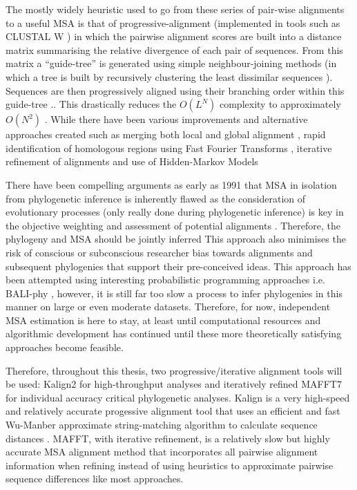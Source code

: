 The mostly widely heuristic used to go from these series of pair-wise alignments to
a useful MSA is that of progressive-alignment \citep{Feng1987} (implemented in 
tools such as CLUSTAL W \citep{Thompson1994}) in which the pairwise alignment
scores are built into a distance matrix summarising the relative divergence of 
each pair of sequences. From this matrix a ``guide-tree'' is generated using simple
neighbour-joining methods (in which a tree is built by recursively clustering
the least dissimilar sequences \citep{Saitou1987}).  Sequences are then progressively
aligned using their branching order within this guide-tree \citep{Thompson1994}..
This drastically reduces the \(O(L^{N})\) complexity to approximately \(O(N^{2})\)
\citep{Sievers2011}. While there have been various improvements and alternative approaches
created such as merging both local and global alignment \citep{Notredame2000}, 
rapid identification of homologous regions using Fast Fourier Transforms \citep{Katoh2002},
iterative refinement of alignments \citep{Edgar2004a} and use of Hidden-Markov Models \citep{Eddy1995}


There have been compelling arguments as early as 1991 that MSA in isolation from
phylogenetic inference is inherently flawed as the consideration of 
evolutionary processes (only really done during phylogenetic inference) 
is key in the objective weighting and assessment of potential alignments \citep{Thorne1991}.
Therefore, the phylogeny and MSA should be jointly inferred \citep{Thorne1991,Redelings2005,Bouchard-Cote2013}
This approach also minimises the risk of conscious or subconscious researcher bias 
towards alignments and subsequent phylogenies that support their pre-conceived ideas.
This approach has been attempted using interesting probabilistic programming approaches
i.e. BALI-phy \citep{Suchard2006}, however, it is still far too
slow a process to infer phylogenies in this manner on large or even moderate datasets.
Therefore, for now, independent MSA estimation is here to stay, at least until
computational resources and algorithmic development has continued until these more
theoretically satisfying approaches become feasible.  

Therefore, throughout this thesis, two progressive/iterative alignment tools will be used:
Kalign2 \citep{Lassmann2005,Lassmann2009} for high-throughput analyses and iteratively refined 
MAFFT7 \citep{Katoh2002,Katoh2005,Katoh2013} for individual accuracy critical phylogenetic analyses. 
Kalign is a very high-speed and relatively accurate \citep{Thompson2011} progessive alignment tool that uses
an efficient and fast Wu-Manber approximate string-matching algorithm to calculate sequence distances
\citep{Lassmann2005}.  MAFFT, with iterative refinement, is a relatively slow but highly accurate
MSA alignment method \citep{Thompson2011} that incorporates all pairwise alignment information when refining
instead of using heuristics to approximate pairwise sequence differences like most approaches.



